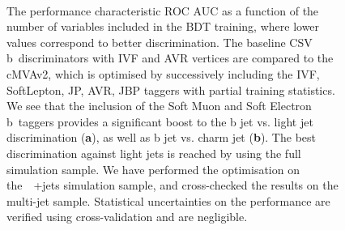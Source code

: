 \begin{figure}
\begin{centering}
 \\
\caption[The cMVAv2 performance as a function of training variables.]{The performance characteristic ROC AUC as a function of the number of variables included in the BDT training, where lower values correspond to better discrimination. The baseline CSV b~discriminators with IVF and AVR vertices are compared to the cMVAv2, which is optimised by successively including the IVF, SoftLepton, JP, AVR, JBP taggers with partial training statistics. We see that the inclusion of the Soft Muon and Soft Electron b~taggers provides a significant boost to the b jet vs. light jet discrimination (\textbf{a}), as well as b jet vs. charm jet (\textbf{b}). The best discrimination against light jets is reached by using the full simulation sample. We have performed the optimisation on the~\ttbar~+jets simulation sample, and cross-checked the results on the multi-jet sample. Statistical uncertainties on the performance are verified using cross-validation and are negligible.}
\label{fig:btag_cmva_roc}
\end{centering}
\end{figure}

